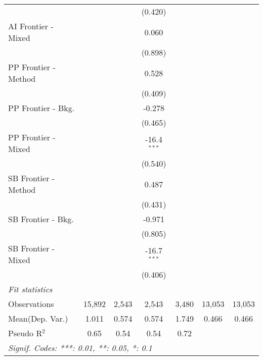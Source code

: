 \begin{tabular}{lcccccc}
                        &               &               & (0.420)       &              &        &   \\   
   AI Frontier - Mixed  &               &               & 0.060         &              &        &   \\   
                        &               &               & (0.898)       &              &        &   \\   
   PP Frontier - Method &               &               & 0.528         &              &        &   \\   
                        &               &               & (0.409)       &              &        &   \\   
   PP Frontier - Bkg.   &               &               & -0.278        &              &        &   \\   
                        &               &               & (0.465)       &              &        &   \\   
   PP Frontier - Mixed  &               &               & -16.4$^{***}$ &              &        &   \\   
                        &               &               & (0.540)       &              &        &   \\   
   SB Frontier - Method &               &               & 0.487         &              &        &   \\   
                        &               &               & (0.431)       &              &        &   \\   
   SB Frontier - Bkg.   &               &               & -0.971        &              &        &   \\   
                        &               &               & (0.805)       &              &        &   \\   
   SB Frontier - Mixed  &               &               & -16.7$^{***}$ &              &        &   \\   
                        &               &               & (0.406)       &              &        &   \\   
   \midrule
   \emph{Fit statistics}\\
   Observations         & 15,892        & 2,543         & 2,543         & 3,480        & 13,053 & 13,053\\  
Mean(Dep. Var.) & 1.011 & 0.574 & 0.574 & 1.749 & 0.466 & 0.466 \\
   Pseudo R$^2$         & 0.65          & 0.54          & 0.54          & 0.72         &        & \\  
   \midrule \midrule
   \multicolumn{7}{l}{\emph{Signif. Codes: ***: 0.01, **: 0.05, *: 0.1}}\\
\end{tabular}
\par\endgroup
